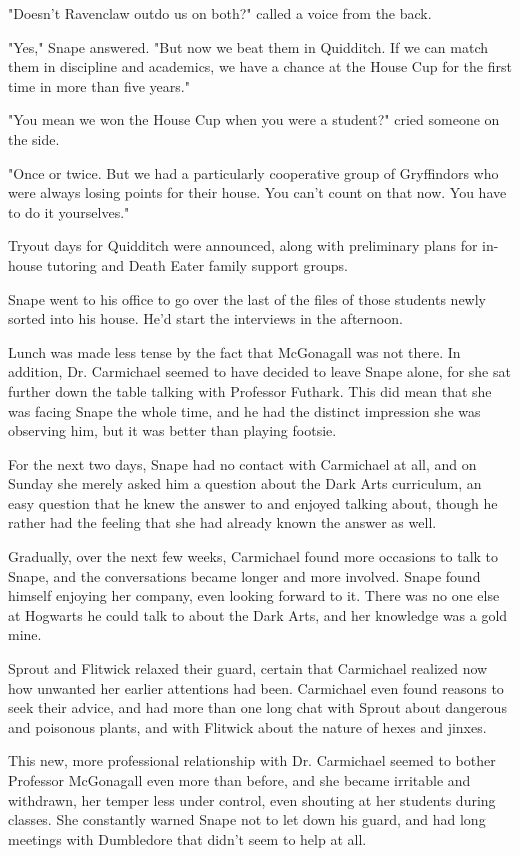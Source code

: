 \documentclass[a4paper,11pt]{article}
\begin{document}
"Doesn't Ravenclaw outdo us on both?" called a voice from the back.

"Yes," Snape answered. "But now we beat them in Quidditch. If we can match them in discipline and academics, we have a chance at the House Cup for the first time in more than five years."

"You mean we won the House Cup when you were a student?" cried someone on the side.

"Once or twice. But we had a particularly cooperative group of Gryffindors who were always losing points for their house. You can't count on that now. You have to do it yourselves."

Tryout days for Quidditch were announced, along with preliminary plans for in-house tutoring and Death Eater family support groups.

Snape went to his office to go over the last of the files of those students newly sorted into his house. He'd start the interviews in the afternoon.

Lunch was made less tense by the fact that McGonagall was not there. In addition, Dr. Carmichael seemed to have decided to leave Snape alone, for she sat further down the table talking with Professor Futhark. This did mean that she was facing Snape the whole time, and he had the distinct impression she was observing him, but it was better than playing footsie.

For the next two days, Snape had no contact with Carmichael at all, and on Sunday she merely asked him a question about the Dark Arts curriculum, an easy question that he knew the answer to and enjoyed talking about, though he rather had the feeling that she had already known the answer as well.

Gradually, over the next few weeks, Carmichael found more occasions to talk to Snape, and the conversations became longer and more involved. Snape found himself enjoying her company, even looking forward to it. There was no one else at Hogwarts he could talk to about the Dark Arts, and her knowledge was a gold mine.

Sprout and Flitwick relaxed their guard, certain that Carmichael realized now how unwanted her earlier attentions had been. Carmichael even found reasons to seek their advice, and had more than one long chat with Sprout about dangerous and poisonous plants, and with Flitwick about the nature of hexes and jinxes.

This new, more professional relationship with Dr. Carmichael seemed to bother Professor McGonagall even more than before, and she became irritable and withdrawn, her temper less under control, even shouting at her students during classes. She constantly warned Snape not to let down his guard, and had long meetings with Dumbledore that didn't seem to help at all.
\end{document}
